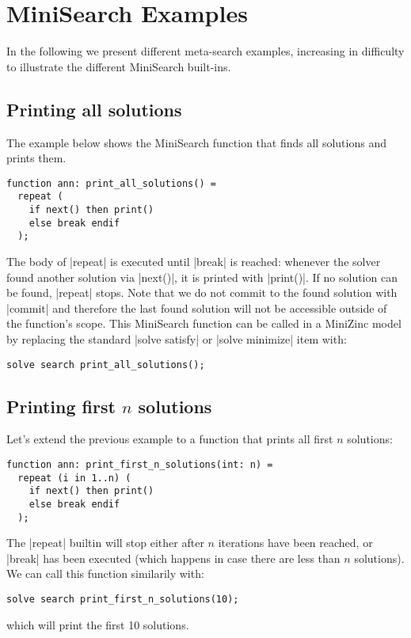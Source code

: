 \documentclass[a4paper,13pt,onecolumn]{article}%
\newcommand{\MiniZinc}{\mbox{\sc MiniZinc}\xspace}
\newcommand{\MiniSearch}{\mbox{\sc MiniSearch}\xspace}
\begin{document}
\section{\MiniSearch Examples}
\label{sec:examples}

In the following we present different meta-search examples, increasing in
difficulty to illustrate the different \MiniSearch built-ins.

\subsection{Printing all solutions}
The example below shows the \MiniSearch function that finds all solutions and prints them.
\begin{lstlisting}
function ann: print_all_solutions() =
  repeat (
    if next() then print()
    else break endif
  );
\end{lstlisting}
The body of \mzninline|repeat| is executed until \mzninline|break|
is reached: whenever the solver found another solution via \mzninline|next()|,
it is printed with \mzninline|print()|. If no solution can be found, 
\mzninline|repeat| stops. Note that we do not commit to the found solution
with \mzninline|commit| and therefore the last found solution will not be
accessible outside of the function's scope.
This \MiniSearch function can be called in a \MiniZinc model by replacing
the standard \mzninline|solve satisfy| or \mzninline|solve minimize| item with:
\begin{lstlisting}
solve search print_all_solutions();
\end{lstlisting}


\subsection{Printing first $n$ solutions}
Let's extend the previous example to a function that prints all
first $n$ solutions:
\begin{lstlisting}
function ann: print_first_n_solutions(int: n) =
  repeat (i in 1..n) (
    if next() then print()
    else break endif
  );
\end{lstlisting}
The \mzninline|repeat| builtin will stop either after 
$n$ iterations have been reached, or \mzninline|break| has been executed
(which happens in case there are less than $n$ solutions).
We can call this function similarily with:
\begin{lstlisting}
solve search print_first_n_solutions(10);
\end{lstlisting}
which will print the first 10 solutions.
\end{document}
